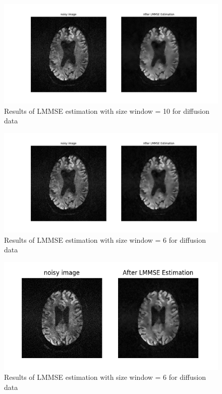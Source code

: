 \begin{figure}[H]
\centering{}\includegraphics[scale=0.5]{figures/Module_4/diff10}\caption{Results of LMMSE estimation with size window = 10 for diffusion data} \label{fig:figures/Module_4/diff10}
\end{figure}

\begin{figure}[H]
\centering{}\includegraphics[scale=0.5]{figures/Module_4/LMMSE_dif2}\caption{Results of LMMSE estimation with size window = 6 for diffusion data} \label{fig:figures/Module_4/LMMSE_dif2}
\end{figure}

\begin{figure}[H]
\centering{}\includegraphics[scale=0.7]{figures/Module_4/LMMSE_dif1}\caption{Results of LMMSE estimation with size window = 6 for diffusion data} \label{fig:figures/Module_4/LMMSE_dif1}
\end{figure}